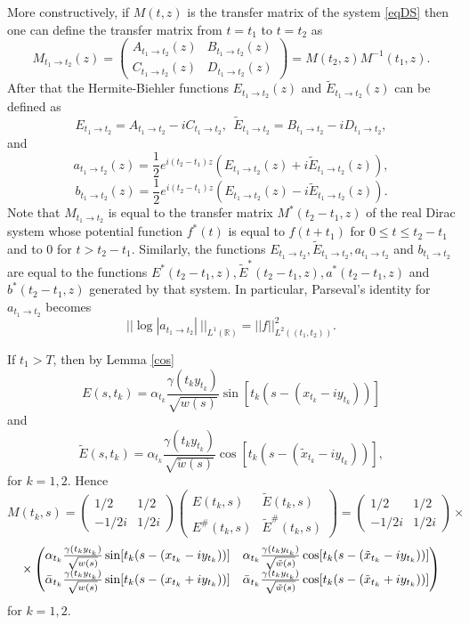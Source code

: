 \documentclass[11pt,twoside,reqno]{amsart}
\def\ti{\tilde}
\def\to{\rightarrow}
\def\R{{\mathbb R}}
\def\g{\gamma}
\def\a{\alpha}
\theoremstyle{plain}
\numberwithin{equation}{section}
\begin{document}
More constructively, if $M(t,z)$ is the transfer matrix of the system \eqref{eqDS} then one can define the transfer
matrix from $t=t_1$ to $t=t_2$ as
$$M_{t_1 \to t_2}(z)=\begin{pmatrix} A_{t_1 \to t_2}(z) & B_{t_1 \to t_2}(z) \\ C_{t_1 \to t_2}(z) & D_{t_1 \to t_2}(z)\end{pmatrix}
=M(t_2,z)M^{-1}(t_1,z).
$$
After that the Hermite-Biehler functions $E_{t_1 \to t_2}(z)$ and $\ti E_{t_1 \to t_2}(z)$ can be defined as
$$E_{t_1 \to t_2}=A_{t_1 \to t_2}-iC_{t_1 \to t_2},\ \ \ti E_{t_1 \to t_2}=B_{t_1 \to t_2}-iD_{t_1 \to t_2},$$
and
$$a_{t_1 \to t_2}(z)=\frac 12 e^{i(t_2-t_1)z}(E_{t_1 \to t_2}(z)+i \ti E_{t_1 \to t_2}(z)),$$
$$b_{t_1 \to t_2}(z)=\frac 12 e^{i(t_2-t_1)z}(E_{t_1 \to t_2}(z)-i \ti E_{t_1 \to t_2}(z)).$$
Note that $M_{t_1 \to t_2}$ is equal to the transfer matrix $M^*(t_2-t_1,z)$ of the real Dirac system whose potential
function $f^*(t)$ is equal to $f(t+t_1)$ for $0\leq t\leq t_2-t_1$ and to $0$ for $t>t_2-t_1$. Similarly,
the functions $E_{t_1 \to t_2}, \ti E_{t_1 \to t_2}, a_{t_1 \to t_2}$ and $b_{t_1 \to t_2}$ are equal to
the functions $E^*(t_2-t_1,z), \ti E^*(t_2-t_1,z), a^*(t_2-t_1,z)$ and  $b^*(t_2-t_1,z)$ generated by that system.
In particular, Parseval's identity for $a_{t_1 \to t_2}$ becomes
$$||\log |a_{t_1 \to t_2}|\ ||_{L^1(\R)}=|| f||^2_{L^2((t_1,t_2))}.$$


\qquad\qquad





If $t_1>T$, then
by Lemma \ref{cos} 
$$E(s, t_k) = \a_{t_k}\frac{\g(t_ky_{t_k})}{\sqrt{w(s)}}\sin [t_k(s-(x_{t_k}-iy_{t_k}))]$$ and $$\ti E(s, t_k) = \a_{t_k}\frac{\g(t_ky_{t_k})}{\sqrt{\ti w(s)}}\cos [t_k(s-(\ti x_{t_k}-iy_{t_k}))],$$
for $k=1,2$.
Hence
$$M(t_k,s)=\begin{pmatrix} 1/2 & 1/2 \\ -1/2i & 1/2i \end{pmatrix}\begin{pmatrix} E(t_k,s) & \ti E(t_k,s) \\ E^\#(t_k,s) & \ti E^\#(t_k,s) \end{pmatrix}=
\begin{pmatrix} 1/2 & 1/2 \\ -1/2i & 1/2i \end{pmatrix}\times$$$$\footnotesize \times
\begin{pmatrix}\a_{t_k}\frac{\g(t_k y_{t_k})}{\sqrt{w(s)}}\sin [t_k(s-(x_{t_k}-iy_{t_k}))] &
 \a_{t_k}\frac{\g(t_k y_{t_k})}{\sqrt{\ti w(s)}}\cos [t_k(s-(\ti x_{t_k}-iy_{t_k}))]\\
\bar \a_{t_k}\frac{ \g(t_k y_{t_k})}{\sqrt{w(s)}}\sin [t_k(s-(x_{t_k}+iy_{t_k}))] &
\bar \a_{t_k}\frac{ \g(t_k y_{t_k})}{\sqrt{\ti w(s)}}\cos [t_k(s-(\ti x_{t_k}+iy_{t_k}))] \end{pmatrix}
$$
for $k=1,2$.
\end{document}
